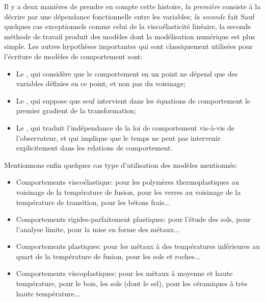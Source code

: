 Il y a deux manières de prendre en compte cette histoire, \emph{la première} consiste à la décrire par une
dépendance fonctionnelle entre les variables; \emph{la seconde} fait 
\medskipvm
Sauf quelques cas exceptionnels comme celui de la viscoélasticité linéaire, la seconde méthode de
travail produit des modèles dont la modélisation numérique est plus simple.
\medskipvm
Les autres hypothèses importantes qui sont classiquement utilisées pour l'écriture de modèles de
comportement sont:
\begin{itemize}
  \item Le , qui considère que le comportement en un point ne dépend
	que des variables définies en ce point, et non pas du voisinage;
  \item Le , qui suppose que seul intervient dans les équations
	de comportement le premier gradient de la transformation;
  \item Le , qui traduit l'indépendance de la loi de comportement vis-à-vis
	de l'observateur, et qui implique que le temps ne peut pas intervenir explicitement dans les relations de
	comportement.
\end{itemize}

\medskip
Mentionnons enfin quelques cas type d'utilisation des modèles mentionnés:
\begin{itemize}
  \item Comportements viscoélastique: pour les polymères thermoplastiques au voisinage de la température
	de fusion, pour les verres au voisinage de la température de transition, pour les bétons frais...
  \item Comportements rigides-parfaitement plastiques: pour l'étude des sols, pour l'analyse limite,
	pour la mise en forme des métaux...
  \item Comportements plastiques: pour les métaux à des températures inférieures au quart de la
	température de fusion, pour les sols et roches...
  \item Comportements viscoplastiques: pour les métaux à moyenne et haute température,
	pour le bois, les sols (dont le sel), pour les céramiques à très haute température...
\end{itemize}

